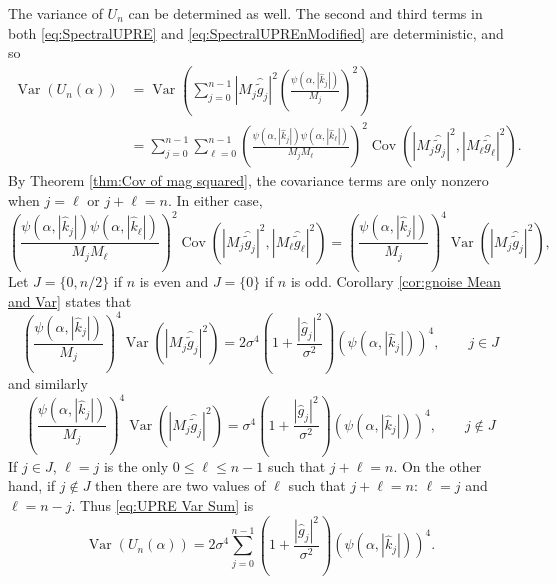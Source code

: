 \documentclass[12pt,notitlepage]{report}
\newcommand{\gnoise}{\widetilde{g}}	%
\newcommand{\regparam}{\alpha}
\newcommand{\mfilt}{\psi}
\newcommand{\noiseSD}{\sigma}	%
\DeclareMathOperator{\Var}{Var}	%
\DeclareMathOperator{\Cov}{Cov}	%
\newcommand{\U}{U}	%
\begin{document}
The variance of $\U_n$ can be determined as well. The second and third terms in both \eqref{eq:SpectralUPRE} and \eqref{eq:SpectralUPREnModified} are deterministic, and so
\begin{equation}
\label{eq:UPRE Var Sum}
\begin{split}
\Var\left(\U_n(\regparam)\right) &= \Var\left(\sum_{j = 0}^{n-1} |M_j\widehat{\gnoise}_j|^2\left(\frac{\mfilt(\regparam,|\widehat{k}_j|)}{M_j}\right)^2\right) \\
&= \sum_{j=0}^{n-1} \sum_{\ell=0}^{n-1} \left(\frac{\mfilt(\regparam,|\widehat{k}_j|)\mfilt(\regparam,|\widehat{k}_\ell|)}{M_jM_\ell}\right)^2 \Cov\left(|M_j\widehat{\gnoise}_j|^2,|M_\ell\widehat{\gnoise}_\ell|^2\right).
\end{split}
\end{equation}
By Theorem \ref{thm:Cov of mag squared}, the covariance terms are only nonzero when $j = \ell$ or $j + \ell = n$. In either case,
\[\left(\frac{\mfilt(\regparam,|\widehat{k}_j|)\mfilt(\regparam,|\widehat{k}_\ell|)}{M_jM_\ell}\right)^2 \Cov\left(|M_j\widehat{\gnoise}_j|^2,|M_\ell\widehat{\gnoise}_\ell|^2\right) = \left(\frac{\mfilt(\regparam,|\widehat{k}_j|)}{M_j}\right)^4 \Var\left(|M_j\widehat{\gnoise}_j|^2\right),\]
Let $J = \{0,n/2\}$ if $n$ is even and $J = \{0\}$ if $n$ is odd. Corollary \ref{cor:gnoise Mean and Var} states that
\[\left(\frac{\mfilt(\regparam,|\widehat{k}_j|)}{M_j}\right)^4 \Var\left(|M_j\widehat{\gnoise}_j|^2\right) = 2\noiseSD^4\left(1 + \dfrac{|\widehat{g}_j|^2}{\noiseSD^2}\right)\left(\mfilt(\regparam,|\widehat{k}_j|)\right)^4, \qquad j \in J\]
and similarly
\[\left(\frac{\mfilt(\regparam,|\widehat{k}_j|)}{M_j}\right)^4 \Var\left(|M_j\widehat{\gnoise}_j|^2\right) = \noiseSD^4\left(1 + \dfrac{|\widehat{g}_j|^2}{\noiseSD^2}\right)\left(\mfilt(\regparam,|\widehat{k}_j|)\right)^4, \qquad j \not\in J\]
If $j \in J$, $\ell = j$ is the only $0 \leq \ell \leq n-1$ such that $j + \ell = n$. On the other hand, if $j \not\in J$ then there are two values of $\ell$ such that $j + \ell = n$: $\ell = j$ and $\ell = n - j$. Thus \eqref{eq:UPRE Var Sum} is
\begin{equation}
\label{eq:UPRE Var Sum Simple}
\Var\left(\U_n(\regparam)\right) = 2\noiseSD^4\sum_{j=0}^{n-1} \left(1 + \dfrac{|\widehat{g}_j|^2}{\noiseSD^2}\right)\left(\mfilt(\regparam,|\widehat{k}_j|)\right)^4.
\end{equation}
\end{document}
